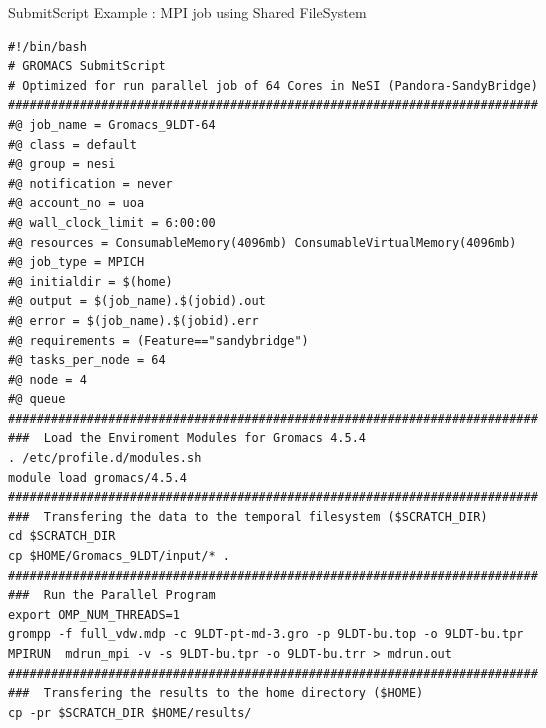 \documentclass[final,t]{beamer}
\begin{document}
\begin{frame}[fragile]{}
\begin{columns}[t]
\begin{column}{.3\linewidth}
    \end{column}

    
    \begin{column}{.35\linewidth}
    
      \begin{block}{SubmitScript Example : MPI job using Shared FileSystem}
              \vspace*{-3ex}
        \begin{verbatim}
#!/bin/bash 
# GROMACS SubmitScript 
# Optimized for run parallel job of 64 Cores in NeSI (Pandora-SandyBridge)
##########################################################################
#@ job_name = Gromacs_9LDT-64
#@ class = default
#@ group = nesi
#@ notification = never
#@ account_no = uoa
#@ wall_clock_limit = 6:00:00
#@ resources = ConsumableMemory(4096mb) ConsumableVirtualMemory(4096mb)
#@ job_type = MPICH
#@ initialdir = $(home)
#@ output = $(job_name).$(jobid).out
#@ error = $(job_name).$(jobid).err
#@ requirements = (Feature=="sandybridge")
#@ tasks_per_node = 64
#@ node = 4
#@ queue
########################################################################## 
###  Load the Enviroment Modules for Gromacs 4.5.4
. /etc/profile.d/modules.sh
module load gromacs/4.5.4
########################################################################## 
###  Transfering the data to the temporal filesystem ($SCRATCH_DIR)
cd $SCRATCH_DIR
cp $HOME/Gromacs_9LDT/input/* .
########################################################################## 
###  Run the Parallel Program
export OMP_NUM_THREADS=1
grompp -f full_vdw.mdp -c 9LDT-pt-md-3.gro -p 9LDT-bu.top -o 9LDT-bu.tpr
MPIRUN  mdrun_mpi -v -s 9LDT-bu.tpr -o 9LDT-bu.trr > mdrun.out 
########################################################################## 
###  Transfering the results to the home directory ($HOME) 
cp -pr $SCRATCH_DIR $HOME/results/
        \end{verbatim}
        \vspace*{-4ex}
      \end{block}



\end{column}
\end{columns}
\end{frame}
\end{document}
